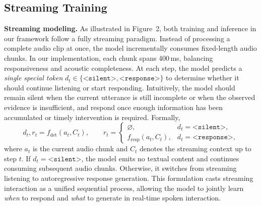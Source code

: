\documentclass{llmxive}
\begin{document}
\subsection{Streaming Training}
\vspace{-1mm}
\textbf{Streaming modeling.}  As illustrated in Figure~2, both training and inference in our framework follow a fully streaming paradigm. Instead of processing a complete audio clip at once, the model incrementally consumes fixed-length audio chunks. In our implementation, each chunk spans 400\,ms, balancing responsiveness and acoustic completeness. At each step, the model predicts a \emph{single special token} $d_t \in \{\texttt{<silent>}, \texttt{<response>}\}$ to determine whether it should continue listening or start responding. Intuitively, the model should remain silent when the current utterance is still incomplete or when the observed evidence is insufficient, and respond once enough information has been accumulated or timely intervention is required. Formally,
\[
d_t, r_t = f_{\mathrm{det}}(a_t, C_t), \qquad
r_t =
\begin{cases}
\varnothing, & d_t=\texttt{<silent>},\\[4pt]
f_{\mathrm{resp}}(a_t, C_t), & d_t=\texttt{<response>},
\end{cases}
\]
where $a_t$ is the current audio chunk and $C_t$ denotes the streaming context up to step $t$. If $d_t=\texttt{<silent>}$, the model emits no textual content and continues consuming subsequent audio chunks. Otherwise, it switches from streaming listening to autoregressive response generation. This formulation casts streaming interaction as a unified sequential process, allowing the model to jointly learn \emph{when} to respond and \emph{what} to generate in real-time spoken interaction.
\end{document}
